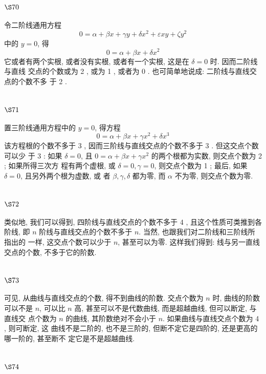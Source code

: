 \section{$\S 70$}

令二阶线通用方程
\[
0=\alpha+\beta x+\gamma y+\delta x^{2}+\varepsilon x y+\zeta y^{2}
\]
中的 $y=0$, 得
\[
0=\alpha+\beta x+\delta x^{2}
\]
它或者有两个实根, 或者没有实根, 或者有一个实根, 这是在 $\delta=0$ 时. 因而二阶线与直线 交点的个数或为 2 , 或为 1 , 或者为 0 . 也可简单地说成: 二阶线与直线交点的个数不多 于 2 .

\section{$\S 71$}

置三阶线通用方程中的 $y=0$, 得方程
\[
0=\alpha+\beta x+\gamma x^{2}+\delta x^{3}
\]
该方程根的个数不多于 3 , 因而三阶线与直线交点的个数不多于 3 . 但这交点个数可以少 于 3 : 如果 $\delta=0$, 且 $0=\alpha+\beta x+\gamma x^{2}$ 的两个根都为实数, 则交点个数为 2 ; 如果所得三次方 程有两个虚根, 或 $\delta=0, \gamma=0$, 则交点个数为 1 ; 最后, 如果 $\delta=0$, 且另外两个根为虚数, 或 者 $\beta, \gamma, \delta$ 都为零, 而 $\alpha$ 不为零, 则交点个数为零.

\section{$\S 72$}

类似地, 我们可以得到, 四阶线与直线交点的个数不多于 4 , 且这个性质可类推到各 阶线, 即 $n$ 阶线与直线交点的个数不多于 $n$. 当然, 也跟我们对二阶线和三阶线所指出的 一样, 这交点个数可以少于 $n$, 甚至可以为零. 这样我们得到: 线与另一直线交点的个数, 不多于它的阶数.

\section{$\S 73$}

可见, 从曲线与直线交点的个数, 得不到曲线的阶数. 交点个数为 $n$ 时, 曲线的阶数 可以不是 $n$, 可以比 $n$ 高, 甚至可以不是代数曲线, 而是超越曲线, 但可以断定, 与直线交 点个数为 $n$ 的曲线, 其阶数绝对不会小于 $n$. 如果曲线与直线交点个数为 4 , 则可断定, 这 曲线不是二阶的, 也不是三阶的, 但断不定它是四阶的, 还是更高的哪一阶的, 甚至断不 定它是不是超越曲线. 

\section{$\S 74$}

